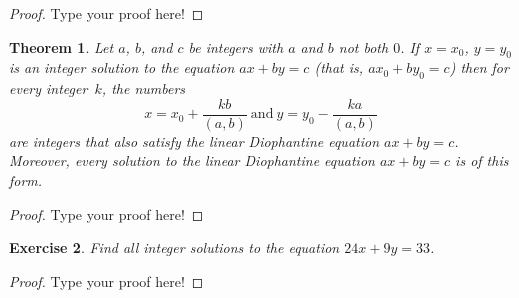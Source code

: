 \documentclass[12pt,leqno]{article}
\numberwithin{equation}{section}
\newtheorem{thm}{Theorem}[section]
\newtheorem{exer}[thm]{Exercise}
\theoremstyle{definition}
\begin{document}
\begin{proof}[Proof]
Type your proof here!
\end{proof}

\setcounter{thm}{52}

\begin{thm}
Let $a$, $b$, and $c$ be integers with $a$ and $b$ not both $0$. If
$x=x_0$, $y=y_0$ is an integer solution to the equation $ax+by=c$
(that is, $ax_0 + by_0 = c$) then for every integer~$k$, the numbers
\[x = x_0 + \frac{kb}{(a,b)}\ {\textstyle\textrm{and}}\ y = y_0 -
\frac{ka}{(a,b)}\] are integers that also satisfy the linear
Diophantine equation $ax + by = c$.  Moreover, every solution to the
linear Diophantine equation $ax + by = c$ is of this form.
\end{thm}

\begin{proof}[Proof]
Type your proof here!
\end{proof}

\begin{exer}
Find all integer solutions to the equation $24x+9y=33$.
\end{exer}

\begin{proof}[Proof]
Type your proof here!
\end{proof}
\end{document}
